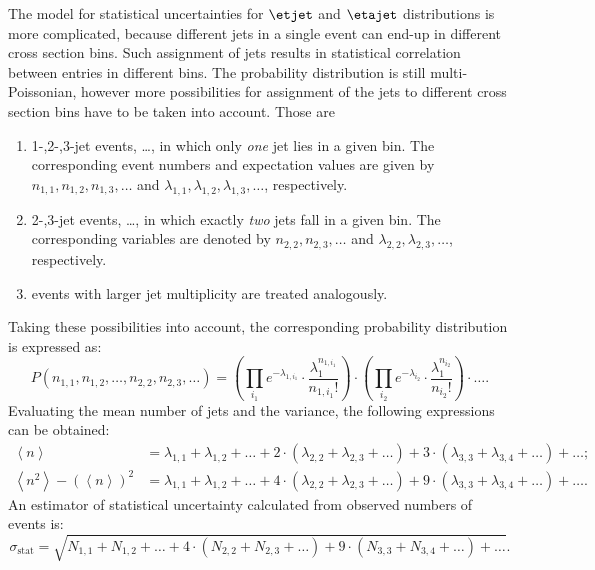 The model for statistical uncertainties for $\etjet$ and $\etajet$ distributions is more complicated, because different jets in a single event can end-up in different cross section bins. Such assignment of jets results in statistical correlation between entries in different bins. The probability distribution is still multi-Poissonian, however more possibilities for assignment of the jets to different cross section bins have to be taken into account. Those are
 \begin{enumerate}
  \item 1-,2-,3-jet events, \ldots, in which only \textit{one} jet lies in a given bin. The corresponding event numbers and expectation values are given by $n_{1,1}, n_{1,2}, n_{1,3}, \ldots$ and $\lambda_{1,1}, \lambda_{1,2}, \lambda_{1,3}, \ldots$, respectively.
  \item 2-,3-jet events, \ldots, in which exactly \textit{two} jets fall in a given bin. The corresponding variables are denoted by $n_{2,2}, n_{2,3}, \ldots$ and $\lambda_{2,2}, \lambda_{2,3}, \ldots$, respectively.
  \item events with larger jet multiplicity are treated analogously.
 \end{enumerate}
Taking these possibilities into account, the corresponding probability distribution is expressed as:
\begin{equation}
P\left(n_{1,1}, n_{1,2},\ldots, n_{2,2}, n_{2,3}, \ldots \right) = \left( \prod_{i_1}{ e^{-\lambda_{1,i_1}} \cdot \frac{\lambda_1^{n_{1,{i_1}}}}{n_{1,{i_1}}!} } \right) \cdot \left( \prod_{i_2}{ e^{-\lambda_{i_2} } \cdot \frac{\lambda_1^{n_{i_2}}}{n_{i_2}!} } \right) \cdot \ldots.
\label{eq:multipoissonqsq}
\end{equation}
Evaluating the mean number of jets and the variance, the following expressions can be obtained:
\begin{align}
 \left\langle n \right\rangle &= \lambda_{1,1} + \lambda_{1,2} + \ldots + 2\cdot\left(\lambda_{2,2}+\lambda_{2,3}+\ldots\right) + 3\cdot\left( \lambda_{3,3} + \lambda_{3,4} + \ldots \right) + \ldots;\\
 \left\langle n^2 \right \rangle - \left( \left\langle n \right \rangle \right)^2 &= \lambda_{1,1} + \lambda_{1,2} + \ldots + 4\cdot\left(\lambda_{2,2}+\lambda_{2,3}+\ldots\right) + 9\cdot\left( \lambda_{3,3} + \lambda_{3,4} + \ldots \right) + \ldots. 
\end{align} 
An estimator of statistical uncertainty calculated from observed numbers of events is:
\begin{equation}
 \sigma_\text{stat} = \sqrt{ N_{1,1} + N_{1,2} + \ldots + 4\cdot\left(N_{2,2}+N_{2,3}+\ldots\right) + 9\cdot\left( N_{3,3} + N_{3,4} + \ldots \right) + \ldots}.
\end{equation}

